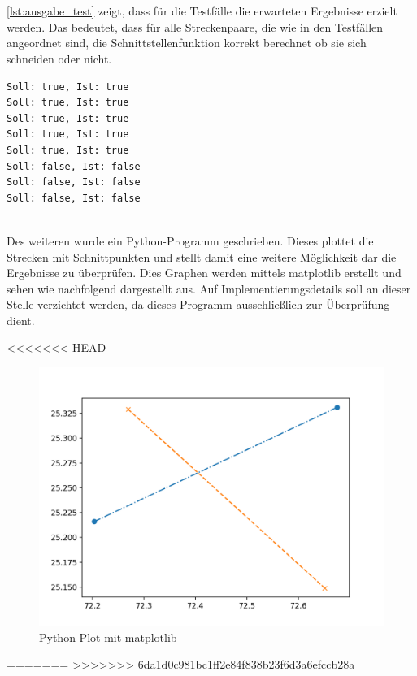 \documentclass[12pt]{scrartcl}
\begin{document}
\ \\~\\
\autoref{lst:ausgabe_test} zeigt, dass für die Testfälle die erwarteten Ergebnisse erzielt werden.
Das bedeutet, dass für alle Streckenpaare, die wie in den Testfällen angeordnet sind, die Schnittstellenfunktion korrekt berechnet ob sie sich schneiden oder nicht.\\

\begin{lstlisting}[style=Terminal, caption={testing.cpp: Ausgabe Konsole},captionpos=b, label={lst:ausgabe_test}]
Soll: true, Ist: true
Soll: true, Ist: true
Soll: true, Ist: true
Soll: true, Ist: true
Soll: true, Ist: true
Soll: false, Ist: false
Soll: false, Ist: false
Soll: false, Ist: false
\end{lstlisting}

\ \\
Des weiteren wurde ein Python-Programm geschrieben. Dieses plottet die Strecken mit Schnittpunkten und stellt damit eine weitere Möglichkeit dar die Ergebnisse zu überprüfen.
Dies Graphen werden mittels matplotlib erstellt und sehen wie nachfolgend dargestellt aus. Auf Implementierungsdetails soll an dieser Stelle verzichtet werden, da dieses Programm ausschließlich zur Überprüfung dient.

<<<<<<< HEAD
\begin{figure}[ht]
    \graphicspath{ {./pictures/} }
    \centering
    \includegraphics[scale=0.8]{python_plot1.png}
    \smallskip
    \caption{Python-Plot mit matplotlib}
    \label{fig:python_plots}
\end{figure}

=======
>>>>>>> 6da1d0c981bc1ff2e84f838b23f6d3a6efccb28a
\end{document}
